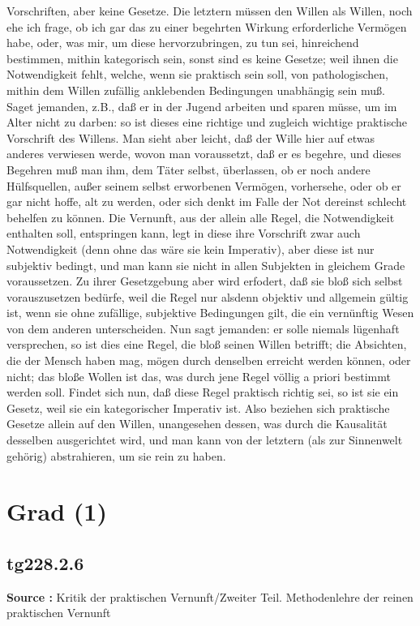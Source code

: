 \documentclass[a4paper,12pt,twoside]{book}
\newcommand{\unnumberedsection}[1]{
	\section*{#1}
	\addcontentsline{toc}{section}{#1}
	\markright{#1}
}
\begin{document}
Vorschriften, aber keine Gesetze. Die letztern müssen den Willen als Willen, noch ehe ich frage, ob ich gar das zu einer begehrten Wirkung erforderliche Vermögen habe, oder, was mir, um diese hervorzubringen, zu tun sei, hinreichend bestimmen, mithin kategorisch sein, sonst sind es keine Gesetze; weil ihnen die Notwendigkeit fehlt, welche, wenn sie praktisch sein soll, von pathologischen, mithin dem Willen zufällig anklebenden Bedingungen unabhängig sein muß. Saget jemanden, z.B., daß er in der Jugend arbeiten und sparen müsse, um im Alter nicht  zu darben: so ist dieses eine richtige und zugleich wichtige praktische Vorschrift des Willens. Man sieht aber leicht, daß der Wille hier auf etwas anderes verwiesen werde, wovon man voraussetzt, daß er es begehre, und dieses Begehren muß man ihm, dem Täter selbst, überlassen, ob er noch andere Hülfsquellen, außer seinem selbst erworbenen Vermögen, vorhersehe, oder ob er gar nicht hoffe, alt zu werden, oder sich denkt im Falle der Not dereinst schlecht behelfen zu können. Die Vernunft, aus der allein alle Regel, die Notwendigkeit enthalten soll, entspringen kann, legt in diese ihre Vorschrift zwar auch Notwendigkeit (denn ohne das wäre sie kein Imperativ), aber diese ist nur subjektiv bedingt, und man kann sie nicht in allen Subjekten in gleichem Grade voraussetzen. Zu ihrer Gesetzgebung aber wird erfodert, daß sie bloß sich selbst vorauszusetzen bedürfe, weil die Regel nur alsdenn objektiv und allgemein gültig ist, wenn sie ohne zufällige, subjektive Bedingungen gilt, die ein vernünftig Wesen von dem anderen unterscheiden. Nun sagt jemanden: er solle niemals lügenhaft versprechen, so ist dies eine Regel, die bloß seinen Willen betrifft; die Absichten, die der Mensch haben mag, mögen durch denselben erreicht werden können, oder nicht; das bloße Wollen ist das, was durch jene Regel völlig a priori bestimmt werden soll. Findet sich nun, daß diese Regel praktisch richtig sei, so ist sie ein Gesetz, weil sie ein kategorischer Imperativ ist. Also beziehen sich praktische Gesetze allein auf den Willen, unangesehen dessen, was durch die Kausalität desselben ausgerichtet wird, und man kann von der letztern (als zur Sinnenwelt gehörig) abstrahieren, um sie rein zu haben. 
	
	\unnumberedsection{Grad (1)} 
	\subsection*{tg228.2.6} 
	\textbf{Source : }Kritik der praktischen Vernunft/Zweiter Teil. Methodenlehre der reinen praktischen Vernunft\\  
	
\end{document}
